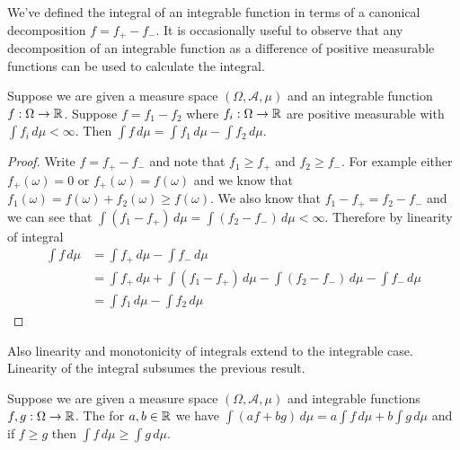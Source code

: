 We've defined the integral of an integrable function in terms of a
canonical decomposition $f = f_+ - f_-$.  It is occasionally useful to
observe that any decomposition of an integrable function as a
difference of positive measurable functions can be used to calculate
the integral.
\begin{lem}Suppose we are given a measure space $(\Omega, \mathcal{A},
  \mu)$ and an integrable function $f : \Omega \to \mathbb{R}$.  Suppose
  $f = f_1 -f_2$ where $f_i  : \Omega \to \mathbb{R}$ are positive measurable
  with $\int f_i \, d \mu < \infty$. Then $\int f \, d\mu = \int f_1 \,
  d\mu - \int f_2 \, d\mu$.
\end{lem}
\begin{proof}Write $f = f_+ - f_-$ and note that $f_1 \geq f_+$ and
  $f_2 \geq f_-$.  For example either $f_+(\omega) = 0$ or
  $f_+(\omega) = f(\omega)$ and we know that $f_1(\omega) = f(\omega)
  + f_2(\omega) \geq f(\omega)$.  We also know that $f_1 - f_+ = f_2 -
  f_-$ and we can see that $\int (f_1 - f_+) \, d\mu = \int (f_2 - f_-) \, d\mu 
  < \infty$.  Therefore by
  linearity of integral
\begin{align*}
\int f \, d\mu &= \int f_+ \, d\mu - \int  f_- \, d\mu \\
&= \int f_+ \, d\mu + \int (f_1 - f_+) \, d\mu - \int (f_2 - f_-) \,
d\mu - \int  f_- \, d\mu \\
&= \int f_1 \, d\mu - \int  f_2 \, d\mu
\end{align*}
\end{proof}
Also linearity and monotonicity of integrals extend to the integrable
case.  Linearity of the integral subsumes the previous result.
\begin{lem}Suppose we are given a measure space $(\Omega, \mathcal{A},
  \mu)$ and integrable functions $f,g: \Omega \to \mathbb{R}$.  The for
  $a,b \in \mathbb{R}$ we have $\int (af + bg) \, d\mu = a\int f \, d\mu +
  b\int g \, d\mu$ and if $f \geq g$ then $\int f \, d\mu \geq \int g \, d\mu$.
\end{lem}
